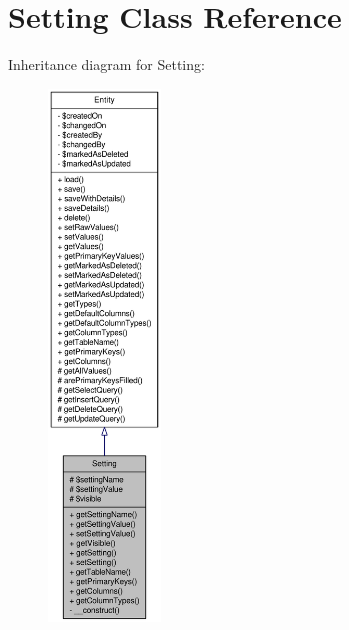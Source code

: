 \hypertarget{classSetting}{
\section{Setting Class Reference}
\label{classSetting}
}


Inheritance diagram for Setting:\nopagebreak
\begin{figure}[H]
\begin{center}
\leavevmode
\includegraphics[height=400pt]{classSetting__inherit__graph}
\end{center}
\end{figure}


